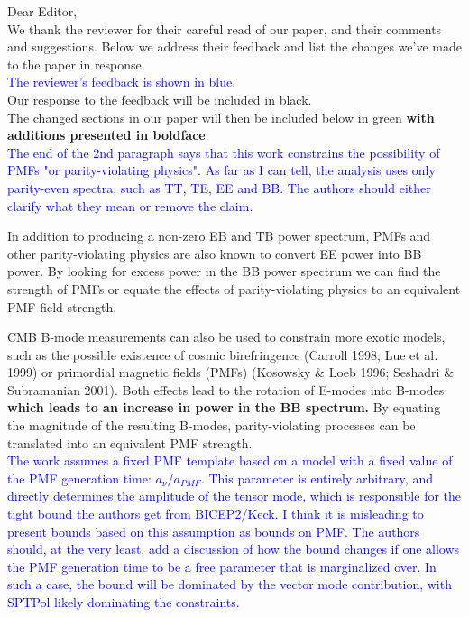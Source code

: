 \documentclass{article}
\newcommand{\added}[1]{\textbf{#1}}
\newcommand{\reviewer}[1]{\textcolor{Blue}{#1}}
\newcommand{\diff}[1]{\textcolor{PineGreen}{#1}}
\begin{document}
Dear Editor,\\

We thank the reviewer for their  careful read of our paper, and their comments and suggestions. Below we address their feedback and list the changes we've made to the paper in response.\\


\reviewer{The reviewer's feedback is shown in blue.}\\

Our response to the feedback will be included in black.\\

\diff{The changed sections in our paper will then be included below in green \added{with additions presented in boldface}}\\


\reviewer{The end of the 2nd paragraph says that this work constrains the possibility of PMFs "or parity-violating physics". As far as I can tell, the analysis uses only parity-even spectra, such as TT, TE, EE and BB. The authors should either clarify what they mean or remove the claim.}

In addition to producing a non-zero EB and TB power spectrum, PMFs and other parity-violating physics are also known to convert EE power into BB power. By looking for excess power in the BB power spectrum we can find the strength of PMFs or equate the effects of parity-violating physics to an equivalent PMF field strength.

\diff{CMB B-mode measurements can also be used to constrain more exotic models, such as the possible existence of cosmic birefringence (Carroll 1998; Lue et al. 1999) or primordial magnetic fields (PMFs) (Kosowsky & Loeb
1996; Seshadri & Subramanian 2001).  
Both effects lead to the rotation of E-modes into B-modes \textbf{which leads to an increase in power in the BB spectrum.}
By equating the magnitude of the resulting B-modes, parity-violating processes can be translated into an equivalent PMF strength.}\\


\reviewer{The work assumes a fixed PMF template based on a model with a fixed value of the PMF generation time: $a_{\nu}/a_{PMF}$. This parameter is entirely arbitrary, and directly determines the amplitude of the tensor mode, which is responsible for the tight bound the authors get from BICEP2/Keck. I think it is misleading to present bounds based on this assumption as bounds on PMF. The authors should, at the very least, add a discussion of how the bound changes if one allows the PMF generation time to be a free parameter that is marginalized over. In such a case, the bound will be dominated by the vector mode contribution, with SPTPol likely dominating the constraints.}
\end{document}
